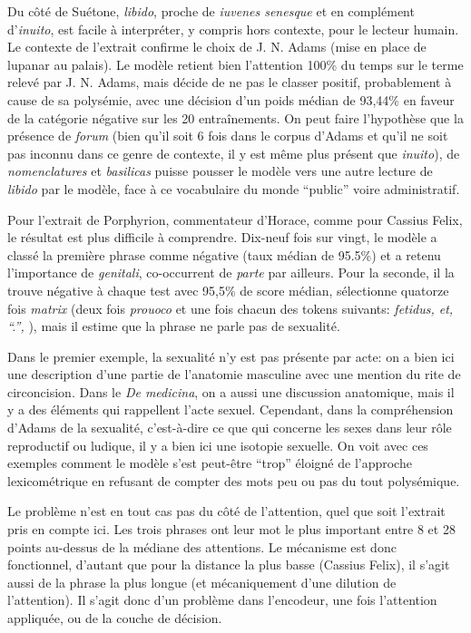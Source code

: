Du côté de Suétone, \textit{libido}, proche de \textit{iuvenes senesque} et en complément d'\textit{inuito}, est facile à interpréter, y compris hors contexte, pour le lecteur humain. Le contexte de l'extrait confirme le choix de J. N. Adams (mise en place de lupanar au palais). Le modèle retient bien l'attention 100\% du temps sur le terme relevé par J. N. Adams, mais décide de ne pas le classer positif, probablement à cause de sa polysémie, avec une décision d'un poids médian de 93,44\% en faveur de la catégorie négative sur les 20 entraînements. On peut faire l'hypothèse que la présence de \textit{forum} (bien qu'il soit 6 fois dans le corpus d'Adams et qu'il ne soit pas inconnu dans ce genre de contexte, il y est même plus présent que \textit{inuito}), de \textit{nomenclatures} et \textit{basilicas} puisse pousser le modèle vers une autre lecture de \textit{libido} par le modèle, face à ce vocabulaire du monde ``public'' voire administratif.

Pour l'extrait de Porphyrion, commentateur d'Horace, comme pour Cassius Felix, le résultat est plus difficile à comprendre. Dix-neuf fois sur vingt, le modèle a classé la première phrase comme négative  (taux médian de 95.5\%) et a retenu l'importance de \textit{genitali}, co-occurrent de \textit{parte} par ailleurs. Pour la seconde, il la trouve négative à chaque test avec 95,5\% de score médian, sélectionne quatorze fois \textit{matrix} (deux fois \textit{prouoco} et une fois chacun des tokens suivants: \textit{fetidus, et, ``.'', }), mais il estime que la phrase ne parle pas de sexualité.

Dans le premier exemple, la sexualité n'y est pas présente par acte: on a bien ici une description d'une partie de l'anatomie masculine avec une mention du rite de circoncision. Dans le \textit{De medicina}, on a aussi une discussion anatomique, mais il y a des éléments qui rappellent l'acte sexuel. Cependant, dans la compréhension d'Adams de la sexualité, c'est-à-dire ce que qui concerne les sexes dans leur rôle reproductif ou ludique, il y a bien ici une isotopie sexuelle. On voit avec ces exemples comment le modèle s'est peut-être ``trop'' éloigné de l'approche lexicométrique en refusant de compter des mots peu ou pas du tout polysémique.

Le problème n'est en tout cas pas du côté de l'attention, quel que soit l'extrait pris en compte ici. Les trois phrases ont leur mot le plus important entre 8 et 28 points au-dessus de la médiane des attentions. Le mécanisme est donc fonctionnel, d'autant que pour la distance la plus basse (Cassius Felix), il s'agit aussi de la phrase la plus longue (et mécaniquement d'une dilution de l'attention). Il s'agit donc d'un problème dans l'encodeur, une fois l'attention appliquée, ou de la couche de décision.

